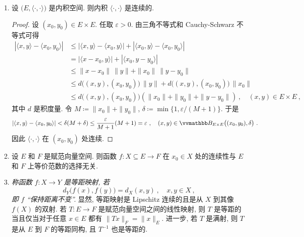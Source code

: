 \begin{example}
\begin{enumerate}
        \[
            d(\cdot, M) \colon X \to \R\ ,\quad x \mapsto d(x, M)
        \]
        是 Lipschitz 连续的.
        \begin{proof}
            设 \(x, y \in X\). 由三角不等式和 \(d(\cdot, M)\) 的定义可得
            \[
                d(x, M) \leq d(x, m) \leq d(x, y) + d(y, m)\ ,\quad m \in M\ .
            \]
            进一步,
            \[
                d(x, M) \leq d(x, y) + d(y, M)\ .
            \]
            将 \(x\) 和 \(y\) 互换位置并结合该不等式可得
            \[
                |d(x, M) - d(y, M)| \leq d(x, y)\ .
            \]
        \end{proof}
        \item 设 \(\bigl(E, \langle \cdot, \cdot \rangle\bigr)\) 是内积空间. 则内积 \(\langle \cdot, \cdot \rangle\) 是连续的.
        \begin{proof}
            设 \((x_0, y_0) \in E \times E\). 任取 \(\varepsilon > 0\). 由三角不等式和 Cauchy-Schwarz 不等式可得
            \begin{align*}
                |\langle x, y \rangle - \langle x_0, y_0 \rangle| &\leq |\langle x, y \rangle - \langle x_0, y \rangle| + |\langle x_0, y \rangle - \langle x_0, y_0 \rangle|\\
                &= |\langle x - x_0, y \rangle| + |\langle x_0, y - y_0 \rangle|\\
                &\leq \|x - x_0\|\, \|y\| + \|x_0\|\, \|y - y_0\|\\
                &\leq d\bigl((x, y), (x_0, y_0)\bigr)\, \|y\| + d\bigl((x, y), (x_0, y_0)\bigr)\, \|x_0\|\\
                &\leq d\bigl((x, y), (x_0, y_0)\bigr) (\|x_0\| + \|y_0\| + \|y - y_0\|)\ ,\quad (x, y) \in E \times E\ ,
            \end{align*}
            其中 \(d\) 是积度量. 令 \(M \coloneqq \|x_0\| + \|y_0\|\), \(\delta \coloneqq \min \bigl\{1, \varepsilon / (M + 1) \bigr\}\). 于是
            \[
                |\langle x, y \rangle - \langle x_0, y_0 \rangle| < \delta (M + \delta) \leq \frac{\varepsilon}{M + 1} (M + 1) = \varepsilon\ ,\quad (x, y) \in \B_{E \times E} \bigl((x_0, y_0), \delta\bigr)\ .
            \]
            因此 \(\langle \cdot, \cdot \rangle\) 在 \((x_0, y_0)\) 处连续.
        \end{proof}
        \item 设 \(E\) 和 \(F\) 是赋范向量空间. 则函数 \(f \colon X \subseteq E \to F\) 在 \(x_0 \in X\) 处的连续性与 \(E\) 和 \(F\) 上等价范数的选择无关.
        \item \textsl{称函数 \(f \colon X \to Y\) 是等距映射, 若
        \[
            d_Y \bigl(f(x), f(y)\bigr) = d_X(x, y)\ ,\quad x, y \in X\ ,
        \]
        即 \(f\) ``保持距离不变''.} 显然, 等距映射是 Lipschitz 连续的且是从 \(X\) 到其像 \(f(X)\) 的双射. 若 \(T \colon E \to F\) 是赋范向量空间之间的线性映射, 则 \(T\) 是等距的当且仅当对于任意 \(x \in E\) 都有 \(\|T x\|_F = \|x\|_E\). 进一步, 若 \(T\) 是满射, 则 \(T\) 是从 \(E\) 到 \(F\) 的等距同构, 且 \(T^{- 1}\) 也是等距的.
    \end{enumerate}
\end{example}

